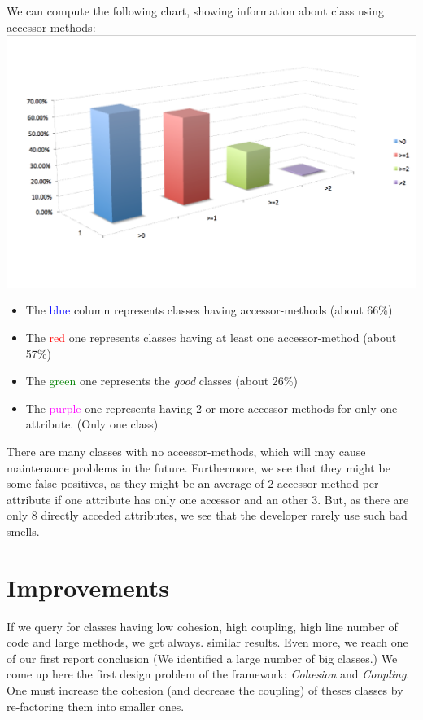 \documentclass[11pt,a4paper]{article}
\begin{document}
We can compute the following chart, showing information about class using accessor-methods:\\
\includegraphics[width=\textwidth]{accessor.png}
\begin{itemize} 
\item The \textcolor{blue}{blue} column represents classes having accessor-methods (about 66\%)
\item The \textcolor{red}{red} one represents classes having at least one accessor-method (about 57\%)
\item The \textcolor{green}{green} one represents the \textit{good} classes (about 26\%)
\item The \textcolor{magenta}{purple} one represents having 2 or more accessor-methods for only one attribute. (Only one class)
\end{itemize}
There are many classes with no accessor-methods, which will may cause maintenance problems in the future. Furthermore, we see that they might be some false-positives, as they might be an average of 2 accessor method per attribute if one attribute has only one accessor and an other 3. But, as there are only 8 directly acceded attributes, we see that the developer rarely use such bad smells.  

\section{Improvements}
If we query for classes having low cohesion, high coupling, high line number of code and large methods, we get always. similar results. Even more, we reach one of our first report conclusion (We identified a large number of big classes.) We come up here the first design problem of the framework: \emph{Cohesion} and \emph{Coupling}. One must increase the cohesion (and decrease the coupling) of theses classes by re-factoring them into smaller ones.\\
\end{document}

